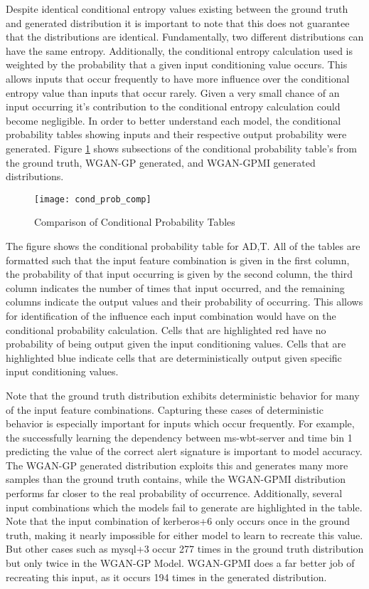 Despite identical conditional entropy values existing between the ground truth and generated distribution it is important to note that this does not guarantee that the distributions are identical. Fundamentally, two different distributions can have the same entropy. Additionally, the conditional entropy calculation used is weighted by the probability that a given input conditioning value occurs. This allows inputs that occur frequently to have more influence over the conditional entropy value than inputs that occur rarely. Given a very small chance of an input occurring it's contribution to the conditional entropy calculation could become negligible. In order to better understand each model, the conditional probability tables showing inputs and their respective output probability were generated. Figure \ref{fig:make_this} shows subsections of the conditional probability table's from the ground truth, WGAN-GP generated, and WGAN-GPMI generated distributions.

\begin{figure}[!htbp]
	\centering
	\texttt{[image: cond\_prob\_comp]}
	\caption{
		Comparison of Conditional Probability Tables
	}
	\label{fig:make_this}
\end{figure}

The figure shows the conditional probability table for A{\given}D,T. All of the tables are formatted such that the input feature combination is given in the first column, the probability of that input occurring is given by the second column, the third column indicates the number of times that input occurred, and the remaining columns indicate the output values and their probability of occurring. This allows for identification of the influence each input combination would have on the conditional probability calculation. Cells that are highlighted red have no probability of being output given the input conditioning values. Cells that are highlighted blue indicate cells that are deterministically output given specific input conditioning values. 

Note that the ground truth distribution exhibits deterministic behavior for many of the input feature combinations. Capturing these cases of deterministic behavior is especially important for inputs which occur frequently. For example, the successfully learning the dependency between ms-wbt-server and time bin 1 predicting the value of the correct alert signature is important to model accuracy. The WGAN-GP generated distribution exploits this and generates many more samples than the ground truth contains, while the WGAN-GPMI distribution performs far closer to the real probability of occurrence. Additionally, several input combinations which the models fail to generate are highlighted in the table. Note that the input combination of kerberos+6 only occurs once in the ground truth, making it nearly impossible for either model to learn to recreate this value. But other cases such as mysql+3 occur 277 times in the ground truth distribution but only twice in the WGAN-GP Model. WGAN-GPMI does a far better job of recreating this input, as it occurs 194 times in the generated distribution.

